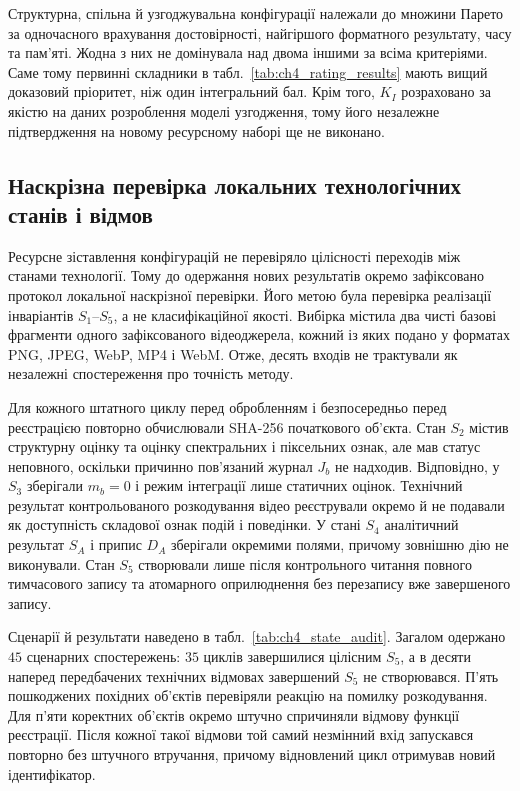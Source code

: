 Структурна, спільна й узгоджувальна конфігурації належали до множини Парето за одночасного врахування достовірності, найгіршого форматного результату, часу та пам’яті. Жодна з них не домінувала над двома іншими за всіма критеріями. Саме тому первинні складники в табл.~\ref{tab:ch4_rating_results} мають вищий доказовий пріоритет, ніж один інтегральний бал. Крім того, $K_I$ розраховано за якістю на даних розроблення моделі узгодження, тому його незалежне підтвердження на новому ресурсному наборі ще не виконано.

\subsection{Наскрізна перевірка локальних технологічних станів і відмов}

Ресурсне зіставлення конфігурацій не перевіряло цілісності переходів між станами технології. Тому до одержання нових результатів окремо зафіксовано протокол локальної наскрізної перевірки. Його метою була перевірка реалізації інваріантів $S_1$--$S_5$, а не класифікаційної якості. Вибірка містила два чисті базові фрагменти одного зафіксованого відеоджерела, кожний із яких подано у форматах PNG, JPEG, WebP, MP4 і WebM. Отже, десять входів не трактували як незалежні спостереження про точність методу.

Для кожного штатного циклу перед обробленням і безпосередньо перед реєстрацією повторно обчислювали SHA-256 початкового об’єкта. Стан $S_2$ містив структурну оцінку та оцінку спектральних і піксельних ознак, але мав статус неповного, оскільки причинно пов’язаний журнал $J_b$ не надходив. Відповідно, у $S_3$ зберігали $m_b=0$ і режим інтеграції лише статичних оцінок. Технічний результат контрольованого розкодування відео реєстрували окремо й не подавали як доступність складової ознак подій і поведінки. У стані $S_4$ аналітичний результат $S_A$ і припис $D_A$ зберігали окремими полями, причому зовнішню дію не виконували. Стан $S_5$ створювали лише після контрольного читання повного тимчасового запису та атомарного оприлюднення без перезапису вже завершеного запису.

Сценарії й результати наведено в табл.~\ref{tab:ch4_state_audit}. Загалом одержано $45$ сценарних спостережень: $35$ циклів завершилися цілісним $S_5$, а в десяти наперед передбачених технічних відмовах завершений $S_5$ не створювався. П’ять пошкоджених похідних об’єктів перевіряли реакцію на помилку розкодування. Для п’яти коректних об’єктів окремо штучно спричиняли відмову функції реєстрації. Після кожної такої відмови той самий незмінний вхід запускався повторно без штучного втручання, причому відновлений цикл отримував новий ідентифікатор.

